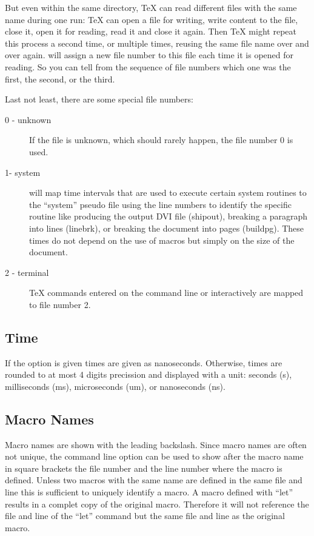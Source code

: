 \documentclass[a4paper,english]{article}
\begin{document}
But even within the same
directory, TeX can read different files with the same name during one
run: TeX can open a file for writing, write content to the file, close
it, open it for reading, read it and close it again. Then TeX might
repeat this process a second time, or multiple times, reusing the same
file name over and over again.   will assign a new file
number to this file each time it is opened for reading. So you can
tell from the sequence of file numbers which one was the first, the
second, or the third.

Last not least, there are some special file
numbers:
\begin{description}
\item[0 - unknown]
  If the file is unknown, which should rarely happen,
  the file number 0 is used.
\item[1- system]
   will map
  time intervals that are used to execute certain system routines
  to the ``system'' pseudo file 
using the line numbers to identify the specific routine
like producing the output DVI file (shipout), breaking
a paragraph into lines (linebrk), or breaking the
document into pages (buildpg). These times do not depend on the
use of macros but simply on the size of the document.
\item[2 - terminal]
  TeX commands entered on the command line or interactively are mapped
  to file number 2.
\end{description}

\subsection{Time}
 If the option  is given times are given as nanoseconds.
 Otherwise, times are rounded to at most 4 digits precission and displayed
 with a unit: seconds (s), milliseconds (ms), microseconds (um), or nanoseconds (ns).

 \subsection{Macro Names}
  Macro names are shown with the leading backslash.
  Since macro names are often not unique, the command line option 
  can be used to show after the macro name in square brackets the file number
  and the line number where the macro is defined.
  Unless two macros with the same name are
  defined in the same file and line this is sufficient to uniquely
  identify a macro. A macro defined with ``let'' results in a complet copy
  of the original macro. Therefore it  will not reference
  the file and line of the ``let'' command but the same file and line as
  the original macro.
\end{document}
